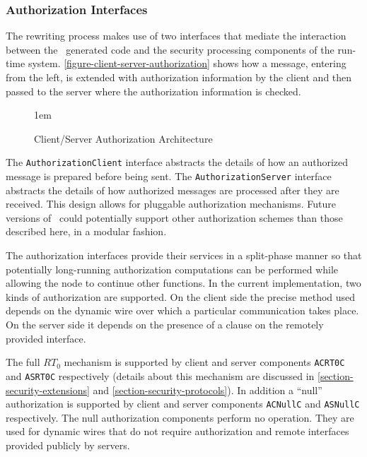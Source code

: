 \subsubsection{Authorization Interfaces}

The rewriting process makes use of two interfaces that mediate the
interaction between the \Sprocket\ generated code and the security
processing components of the run-time system.
\autoref{figure-client-server-authorization} shows how a message,
entering from the left, is extended with authorization information by
the client and then passed to the server where the authorization
information is checked.

\begin{figure}[htbp]
  
  \centerline{\raise 1em\box\graph}
  \caption{Client/Server Authorization Architecture}
  \label{figure-client-server-authorization}
\end{figure}

The \texttt{AuthorizationClient} interface abstracts the details of how
an authorized message is prepared before being sent. The
\texttt{AuthorizationServer} interface abstracts the details of how
authorized messages are processed after they are received. This design
allows for pluggable authorization mechanisms. Future versions of
\Sprocket\ could potentially support other authorization schemes than
those described here, in a modular fashion.

The authorization interfaces provide their services in a split-phase
manner so that potentially long-running authorization computations can
be performed while allowing the node to continue other functions. In the
current implementation, two kinds of authorization are supported. On the
client side the precise method used depends on the dynamic wire over
which a particular communication takes place. On the server side it
depends on the presence of a  clause on the remotely
provided interface.

The full $RT_0$ mechanism is supported by client and server components
\texttt{ACRT0C} and \texttt{ASRT0C} respectively (details about this
mechanism are discussed in \autoref{section-security-extensions} and
\autoref{section-security-protocols}). In addition a ``null''
authorization is supported by client and server components
\texttt{ACNullC} and \texttt{ASNullC} respectively. The null
authorization components perform no operation. They are used for dynamic
wires that do not require authorization and remote interfaces provided
publicly by servers.

